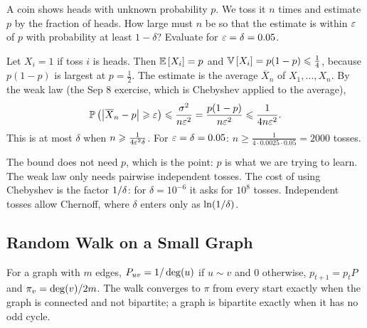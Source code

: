 \begin{exercisebox}
\begin{pproblem}\label{pp:coin}
    A coin shows heads with unknown probability $p$. We toss it $n$ times and estimate $p$ by the
    fraction of heads. How large must $n$ be so that the estimate is within $\varepsilon$ of $p$ with
    probability at least $1 - \delta$? Evaluate for $\varepsilon = \delta = 0.05$.
\end{pproblem}
\tcblower
\begin{wsolution}
    Let $X_i = 1$ if toss $i$ is heads. Then $\operatorname{\mathbb{E}}\left[X_i\right] = p$ and
    $\operatorname{\mathbb{V}}\left[X_i\right] = p(1-p) \leqslant \frac{1}{4}$, because $p(1-p)$ is largest at $p = \frac{1}{2}$. The
    estimate is the average $\overline{X}_n$ of $X_1, \dots, X_n$. By the weak law (the Sep 8
    exercise, which is Chebyshev applied to the average),
    \[\operatorname{\mathbb{P}}\left(\left\lvert\overline{X}_n - p\right\rvert \geqslant \varepsilon\right) \leqslant \frac{\sigma^2}{n\varepsilon^2}
        = \frac{p(1-p)}{n\varepsilon^2} \leqslant \frac{1}{4n\varepsilon^2}.\]
    This is at most $\delta$ when $n \geqslant \frac{1}{4\varepsilon^2\delta}$. For $\varepsilon = \delta = 0.05$:
    $n \geq \frac{1}{4 \cdot 0.0025 \cdot 0.05} = 2000$ tosses.

    The bound does not need $p$, which is the point: $p$ is what we are trying to learn. The weak
    law only needs pairwise independent tosses. The cost of using Chebyshev is the factor
    $1/\delta$: for $\delta = 10^{-6}$ it asks for $10^8$ tosses. Independent tosses allow
    Chernoff, where $\delta$ enters only as $\ln(1/\delta)$.
\end{wsolution}
\end{exercisebox}


\subsection{Random Walk on a Small Graph}

For a graph with $m$ edges, $P_{uv} = 1/\deg(u)$ if $u \sim v$ and $0$ otherwise,
$p_{t+1} = p_t P$ and $\pi_v = \deg(v)/2m$. The walk converges to $\pi$ from every start
exactly when the graph is connected and not bipartite; a graph is bipartite exactly when it has no
odd cycle.

